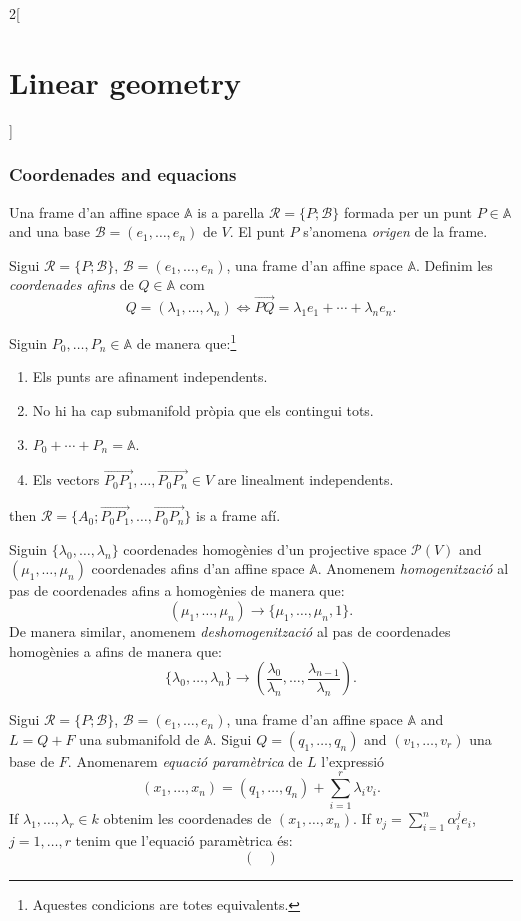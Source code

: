 \documentclass[class=article,10pt,crop=false]{standalone}
\begin{document}
\begin{multicols}{2}[\section{Linear geometry}]
\subsubsection{Coordenades and equacions}
\begin{definition}
Una frame d'an affine space $\mathbb{A}$ is a parella $\mathcal{R}=\{P;\mathcal{B}\}$ formada per un punt $P\in\mathbb{A}$ and una base $\mathcal{B}=(e_1,\ldots,e_n)$ de $V$. El punt $P$ s'anomena \textit{origen} de la frame.
\end{definition}
\begin{definition}
Sigui $\mathcal{R}=\{P;\mathcal{B}\}$, $\mathcal{B}=(e_1,\ldots,e_n)$, una frame d'an affine space $\mathbb{A}$. Definim les \textit{coordenades afins} de $Q\in\mathbb{A}$ com $$Q=(\lambda_1,\ldots,\lambda_n)\iff\overrightarrow{PQ}=\lambda_1e_1+\cdots+\lambda_ne_n.$$
\end{definition}
\begin{prop}
Siguin $P_0,\ldots,P_n\in\mathbb{A}$ de manera que:\footnote{Aquestes condicions are totes equivalents.}
\begin{enumerate}
    \item Els punts are afinament independents.
    \item No hi ha cap submanifold pròpia que els contingui tots.
    \item $P_0+\cdots+P_n=\mathbb{A}$.
    \item Els vectors $\overrightarrow{P_0P_1},\ldots,\overrightarrow{P_0P_n}\in V$ are linealment independents.
\end{enumerate}
then $\mathcal{R}=\{A_0;\overrightarrow{P_0P_1},\ldots,\overrightarrow{P_0P_n}\}$ is a frame afí.
\end{prop}
\begin{definition}
Siguin $\{\lambda_0,\ldots,\lambda_n\}$ coordenades homogènies d'un projective space $\mathcal{P}(V)$ and $(\mu_1,\ldots,\mu_n)$ coordenades afins d'an affine space $\mathbb{A}$. Anomenem \textit{homogenització} al pas de coordenades afins a homogènies de manera que: $$(\mu_1,\ldots,\mu_n)\rightarrow\{\mu_1,\ldots,\mu_n,1\}.$$ De manera similar, anomenem \textit{deshomogenització} al pas de coordenades homogènies a afins de manera que: $$\{\lambda_0,\ldots,\lambda_n\}\rightarrow\left(\frac{\lambda_0}{\lambda_n},\ldots,\frac{\lambda_{n-1}}{\lambda_n}\right).$$
\end{definition}
\begin{definition}
Sigui $\mathcal{R}=\{P;\mathcal{B}\}$, $\mathcal{B}=(e_1,\ldots,e_n)$, una frame d'an affine space $\mathbb{A}$ and $L=Q+F$ una submanifold de $\mathbb{A}$. Sigui $Q=(q_1,\ldots,q_n)$ and $(v_1,\ldots,v_r)$ una base de $F$. Anomenarem \textit{equació paramètrica} de $L$ l’expressió $$(x_1,\ldots,x_n)=(q_1,\ldots,q_n)+\sum_{i=1}^r\lambda_iv_i.$$ If $\lambda_1,\ldots,\lambda_r\in k$ obtenim les coordenades de $(x_1,\ldots,x_n)$. If $\displaystyle v_j=\sum_{i=1}^n\alpha_i^je_i$, $j=1,\ldots,r$ tenim que l'equació paramètrica és: $$\begin{pmatrix}

\end{pmatrix}$$
\end{definition}
\end{multicols}
\end{document}

